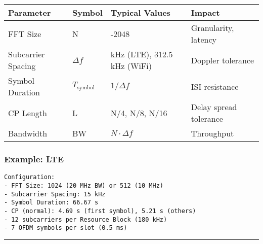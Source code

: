 {\def\LTcaptype{} %
\begin{longtable}[]{@{}
  >{\raggedright\arraybackslash}p{}
  >{\raggedright\arraybackslash}p{}
  >{\raggedright\arraybackslash}p{}
  >{\raggedright\arraybackslash}p{}@{}}
\toprule\noalign{}
\begin{minipage}[b]{\linewidth}\raggedright
Parameter
\end{minipage} & \begin{minipage}[b]{\linewidth}\raggedright
Symbol
\end{minipage} & \begin{minipage}[b]{\linewidth}\raggedright
Typical Values
\end{minipage} & \begin{minipage}[b]{\linewidth}\raggedright
Impact
\end{minipage} \\
\midrule\noalign{}
\endhead
\bottomrule\noalign{}
\endlastfoot
FFT Size & N & 64-2048 & Granularity, latency \\
Subcarrier Spacing & \(\Delta f\) & 15 kHz (LTE), 312.5 kHz (WiFi) &
Doppler tolerance \\
Symbol Duration & \(T_{\text{symbol}}\) & \(1/\Delta f\) & ISI
resistance \\
CP Length & L & N/4, N/8, N/16 & Delay spread tolerance \\
Bandwidth & BW & \(N \cdot \Delta f\) & Throughput \\
\end{longtable}
}

\subsubsection{Example: LTE}\label{example-lte}

\begin{verbatim}
Configuration:
- FFT Size: 1024 (20 MHz BW) or 512 (10 MHz)
- Subcarrier Spacing: 15 kHz
- Symbol Duration: 66.67 s
- CP (normal): 4.69 s (first symbol), 5.21 s (others)
- 12 subcarriers per Resource Block (180 kHz)
- 7 OFDM symbols per slot (0.5 ms)
\end{verbatim}

\begin{center}\rule{0.5\linewidth}{0.5pt}\end{center}


